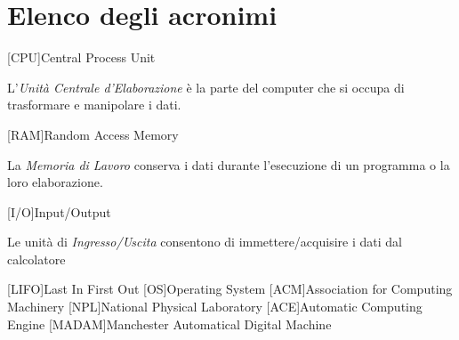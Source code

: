 \chapter{Elenco degli acronimi}
\begin{acronym}[MADAM]
	[CPU]{Central Process Unit}
{\small\par\noindent L'\emph{Unità Centrale d'Elaborazione} è la parte del computer che si occupa di trasformare e manipolare i dati.}
	[RAM]{Random Access Memory}
{\small\par\noindent La \emph{Memoria di Lavoro} conserva i dati durante l'esecuzione di un programma o la loro elaborazione.}
	[I/O]{Input/Output}
{\small\par\noindent Le unità di \emph{Ingresso/Uscita} consentono di immettere/acquisire i dati dal calcolatore}
	[LIFO]{Last In First Out}
	[OS]{Operating System}
	[ACM]{Association for Computing Machinery}
	[NPL]{National Physical Laboratory}
	[ACE]{Automatic Computing Engine}
	[MADAM]{Manchester Automatical Digital Machine}
\end{acronym}